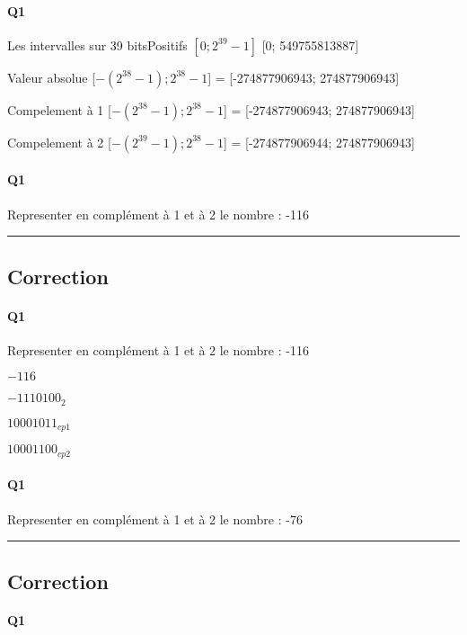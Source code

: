 \paragraph{Q1}

Les intervalles sur 39 bitsPositifs $[0; 2^{39}-1]$ [0; 549755813887]

Valeur absolue [$-(2^{38}-1);2^{38}-1$] = [-274877906943; 274877906943]

Compelement à 1 [$-(2^{38}-1);2^{38}-1$] = [-274877906943; 274877906943]

Compelement à 2 [$-(2^{39}-1);2^{38}-1$] = [-274877906944; 274877906943]
\pagebreak

\paragraph{Q1}

Representer en complément à 1 et à 2 le nombre  : -116


\hrule width 1\linewidth
\pagebreak

\subsection{Correction}


\paragraph{Q1}

Representer en complément à 1 et à 2 le nombre  : -116

$-116$

$ -1110100_{2}$

$ 10001011_{cp1}$

$ 10001100_{cp2}$
\pagebreak

\paragraph{Q1}

Representer en complément à 1 et à 2 le nombre  : -76


\hrule width 1\linewidth
\pagebreak

\subsection{Correction}


\paragraph{Q1}

